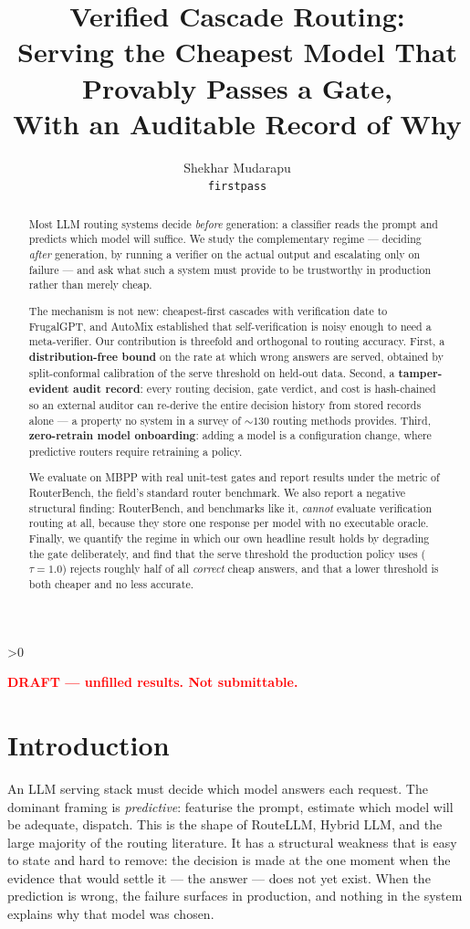 \documentclass[11pt]{article}
\title{Verified Cascade Routing:\\
Serving the Cheapest Model That Provably Passes a Gate,\\
With an Auditable Record of Why}
\author{Shekhar Mudarapu\\ \texttt{firstpass}}
\date{}
\newcounter{todocount}
\newcommand{\fillcheck}{%
  \ifnum\value{todocount}>0
    \begin{center}\textcolor{red}{\textbf{DRAFT --- \arabic{todocount} unfilled results.
    Not submittable.}}\end{center}
  \fi}
\begin{document}
\maketitle

\begin{abstract}
Most LLM routing systems decide \emph{before} generation: a classifier reads the prompt and
predicts which model will suffice. We study the complementary regime --- deciding \emph{after}
generation, by running a verifier on the actual output and escalating only on failure --- and ask
what such a system must provide to be trustworthy in production rather than merely cheap.

The mechanism is not new: cheapest-first cascades with verification date to FrugalGPT, and AutoMix
established that self-verification is noisy enough to need a meta-verifier. Our contribution is
threefold and orthogonal to routing accuracy. First, a \textbf{distribution-free bound} on the rate
at which wrong answers are served, obtained by split-conformal calibration of the serve threshold
on held-out data. Second, a \textbf{tamper-evident audit record}: every routing decision, gate
verdict, and cost is hash-chained so an external auditor can re-derive the entire decision history
from stored records alone --- a property no system in a survey of ${\sim}130$ routing methods
provides. Third, \textbf{zero-retrain model onboarding}: adding a model is a configuration change,
where predictive routers require retraining a policy.

We evaluate on MBPP with real unit-test gates and report results under the metric of RouterBench,
the field's standard router benchmark. We also report a negative structural finding: RouterBench,
and benchmarks like it, \emph{cannot} evaluate verification routing at all, because they store one
response per model with no executable oracle. Finally, we quantify the regime in which our own
headline result holds by degrading the gate deliberately, and find that the serve threshold the production policy uses ($\tau = 1.0$) rejects roughly half of
all \emph{correct} cheap answers, and that a lower threshold is both cheaper and no less accurate.
\end{abstract}

\fillcheck

\section{Introduction}

An LLM serving stack must decide which model answers each request. The dominant framing is
\emph{predictive}: featurise the prompt, estimate which model will be adequate, dispatch. This is
the shape of RouteLLM, Hybrid LLM, and the large majority of the routing literature. It has a
structural weakness that is easy to state and hard to remove: the decision is made at the one moment
when the evidence that would settle it --- the answer --- does not yet exist. When the prediction is
wrong, the failure surfaces in production, and nothing in the system explains why that model was
chosen.
\end{document}
